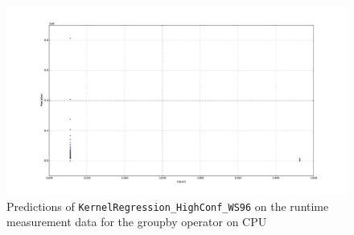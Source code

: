 \begin{figure}[htbp]
  \centering
    \includegraphics[width=\linewidth]{./Figures/kreg_ws96_ocl_groupby_on_device_on_cpu.pdf}
  \caption{Predictions of \texttt{KernelRegression\_HighConf\_WS96} on the runtime measurement data for the groupby operator on CPU}
  \label{kreg_ws96_ocl_groupby_on_device_on_cpu}
\end{figure}




